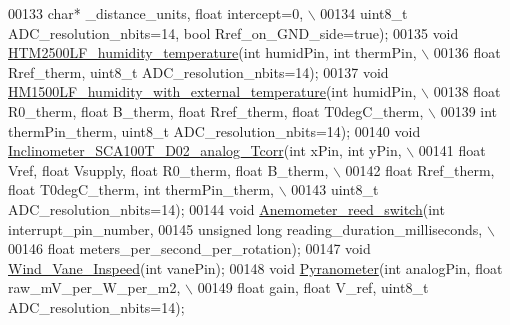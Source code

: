 \begin{DoxyCode}
00133          \textcolor{keywordtype}{char}* \_distance\_units, \textcolor{keywordtype}{float} intercept=0, \(\backslash\)
00134          uint8\_t ADC\_resolution\_nbits=14, \textcolor{keywordtype}{bool} Rref\_on\_GND\_side=\textcolor{keyword}{true});
00135     \textcolor{keywordtype}{void} \hyperlink{classLogger_a4ccff7a14a6bddc8bb28e22b3b36d3cc}{HTM2500LF\_humidity\_temperature}(\textcolor{keywordtype}{int} humidPin, \textcolor{keywordtype}{int} thermPin, \(\backslash\)
00136          \textcolor{keywordtype}{float} Rref\_therm, uint8\_t ADC\_resolution\_nbits=14);
00137     \textcolor{keywordtype}{void} \hyperlink{classLogger_a62b74ddb3cf9fdd7dae2394c1b245ed4}{HM1500LF\_humidity\_with\_external\_temperature}(\textcolor{keywordtype}{int} 
      humidPin, \(\backslash\)
00138          \textcolor{keywordtype}{float} R0\_therm, \textcolor{keywordtype}{float} B\_therm, \textcolor{keywordtype}{float} Rref\_therm, \textcolor{keywordtype}{float} T0degC\_therm, \(\backslash\)
00139          \textcolor{keywordtype}{int} thermPin\_therm, uint8\_t ADC\_resolution\_nbits=14);
00140     \textcolor{keywordtype}{void} \hyperlink{classLogger_a80fdea5a339573980f9544ac64678411}{Inclinometer\_SCA100T\_D02\_analog\_Tcorr}(\textcolor{keywordtype}{int} xPin, \textcolor{keywordtype}{int} yPin, \(\backslash\)
00141          \textcolor{keywordtype}{float} Vref, \textcolor{keywordtype}{float} Vsupply, \textcolor{keywordtype}{float} R0\_therm, \textcolor{keywordtype}{float} B\_therm, \(\backslash\)
00142          \textcolor{keywordtype}{float} Rref\_therm, \textcolor{keywordtype}{float} T0degC\_therm, \textcolor{keywordtype}{int} thermPin\_therm, \(\backslash\)
00143          uint8\_t ADC\_resolution\_nbits=14);
00144     \textcolor{keywordtype}{void} \hyperlink{classLogger_a6c6a43a1b86f88c2a5e33d14c992e510}{Anemometer\_reed\_switch}(\textcolor{keywordtype}{int} interrupt\_pin\_number, 
00145          \textcolor{keywordtype}{unsigned} \textcolor{keywordtype}{long} reading\_duration\_milliseconds, \(\backslash\)
00146          \textcolor{keywordtype}{float} meters\_per\_second\_per\_rotation);
00147     \textcolor{keywordtype}{void} \hyperlink{classLogger_a31c3cba5ff5722fb66bf540bfbe8b25d}{Wind\_Vane\_Inspeed}(\textcolor{keywordtype}{int} vanePin);
00148     \textcolor{keywordtype}{void} \hyperlink{classLogger_ae4190ce7ccfd7b148a6151102a3bf93d}{Pyranometer}(\textcolor{keywordtype}{int} analogPin, \textcolor{keywordtype}{float} raw\_mV\_per\_W\_per\_m2, \(\backslash\)
00149          \textcolor{keywordtype}{float} gain, \textcolor{keywordtype}{float} V\_ref, uint8\_t ADC\_resolution\_nbits=14);

\end{DoxyCode}
